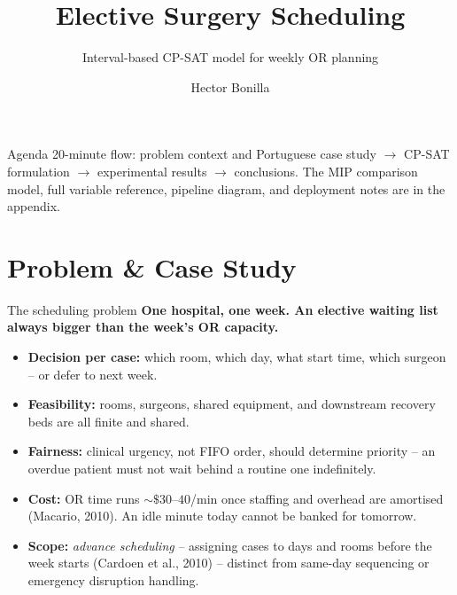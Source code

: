 \documentclass[10pt,aspectratio=169]{beamer}
\title{\large Elective Surgery Scheduling}
\subtitle{Interval-based CP-SAT model for weekly OR planning}
\author{Hector Bonilla}
\date{}
\begin{document}
\begin{frame}\titlepage\end{frame}

\begin{frame}{Agenda}
  \hypertarget{toc}{}
  \tableofcontents
  \vspace{0.4em}
  \footnotesize 20-minute flow: problem context and Portuguese case study
  $\to$ CP-SAT formulation $\to$ experimental results $\to$ conclusions.
  The MIP comparison model, full variable reference, pipeline diagram,
  and deployment notes are in the appendix.
\end{frame}

\section{Problem \& Case Study}

\begin{frame}{The scheduling problem}
  \textbf{One hospital, one week. An elective waiting list always bigger
  than the week's OR capacity.}
  \begin{itemize}\small
    \item \textbf{Decision per case:} which room, which day, what start
      time, which surgeon -- or defer to next week.
    \item \textbf{Feasibility:} rooms, surgeons, shared equipment, and
      downstream recovery beds are all finite and shared.
    \item \textbf{Fairness:} clinical urgency, not FIFO order, should
      determine priority -- an overdue patient must not wait behind a
      routine one indefinitely.
    \item \textbf{Cost:} OR time runs $\sim\$30$--$40$/min once staffing
      and overhead are amortised (Macario, 2010). An idle minute today
      cannot be banked for tomorrow.
    \item \textbf{Scope:} \emph{advance scheduling} -- assigning cases
      to days and rooms before the week starts (Cardoen et al., 2010) --
      distinct from same-day sequencing or emergency disruption handling.
  \end{itemize}
\end{frame}
\end{document}
